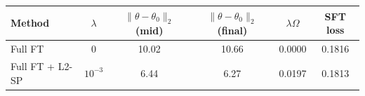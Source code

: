 \begin{tabular}{lccccc}
\toprule
Method & $\lambda$ & $\lVert\theta-\theta_0\rVert_2$ (mid) & $\lVert\theta-\theta_0\rVert_2$ (final) & $\lambda\Omega$ & SFT loss \\
\midrule
Full FT & 0 & 10.02 & 10.66 & 0.0000 & 0.1816 \\
Full FT + L2-SP & $10^{-3}$ & 6.44 & 6.27 & 0.0197 & 0.1813 \\
\bottomrule
\end{tabular}
